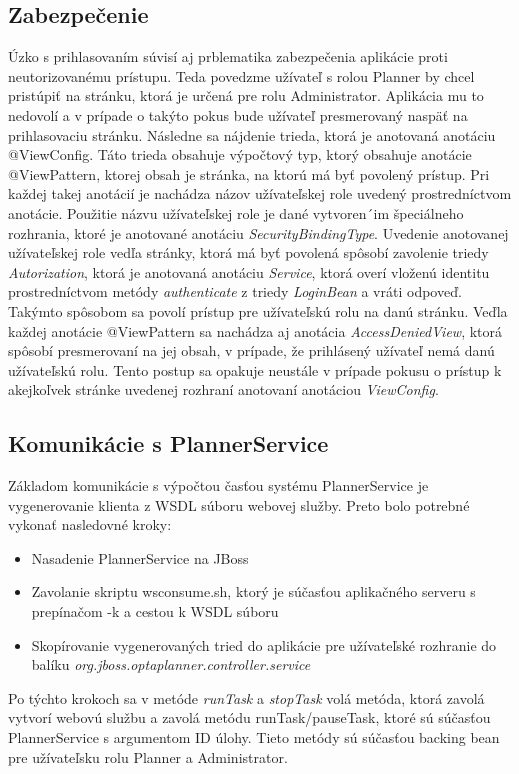 \subsection{Zabezpečenie}
Úzko s prihlasovaním súvisí aj prblematika zabezpečenia aplikácie proti neutorizovanému prístupu. Teda povedzme užívateľ s rolou Planner by chcel pristúpiť na stránku, ktorá je určená pre rolu Administrator. Aplikácia mu to nedovolí a v prípade o takýto pokus bude užívateľ presmerovaný naspäť na prihlasovaciu stránku. Následne sa nájdenie trieda, ktorá je anotovaná anotáciu @ViewConfig. Táto trieda obsahuje výpočtový typ, ktorý obsahuje anotácie @ViewPattern, ktorej obsah je stránka, na ktorú má byť povolený prístup. Pri každej takej anotácií je nachádza názov užívateľskej role uvedený prostredníctvom anotácie. Použitie názvu užívateľskej role je dané vytvoren´im špeciálneho rozhrania, ktoré je anotované anotáciu \emph{SecurityBindingType}. Uvedenie anotovanej užívateľskej role vedľa stránky, ktorá má byť povolená spôsobí zavolenie triedy \emph{Autorization}, ktorá je anotovaná anotáciu \emph{Service}, ktorá overí vloženú identitu prostredníctvom metódy \emph{authenticate} z triedy \emph{LoginBean} a vráti odpoveď. Takýmto spôsobom sa povolí prístup pre užívateľskú rolu na danú stránku. Veďla každej anotácie @ViewPattern sa nachádza aj anotácia \emph{AccessDeniedView}, ktorá spôsobí presmerovaní na jej obsah, v prípade, že prihlásený užívateľ nemá danú užívateľskú rolu. Tento postup sa opakuje neustále v prípade pokusu o prístup k akejkoľvek stránke uvedenej rozhraní anotovaní anotáciou \emph{ViewConfig}.



\subsection{Komunikácie s PlannerService}
Základom komunikácie s výpočtou časťou systému PlannerService je vygenerovanie klienta z WSDL súboru webovej služby. Preto bolo potrebné vykonať nasledovné kroky:
\begin{itemize}
\item Nasadenie PlannerService na JBoss
\item Zavolanie skriptu wsconsume.sh, ktorý je súčasťou aplikačného serveru s prepínačom -k a cestou k WSDL súboru
\item Skopírovanie vygenerovaných tried do aplikácie pre užívateľské rozhranie do balíku \emph{org.jboss.optaplanner.controller.service}
\end{itemize}
Po týchto krokoch sa v metóde \emph{runTask} a \emph{stopTask} volá metóda, ktorá zavolá vytvorí webovú službu a zavolá metódu runTask/pauseTask, ktoré sú súčasťou PlannerService s argumentom ID úlohy. Tieto metódy sú súčasťou backing bean pre užívateľsku rolu Planner a Administrator.



